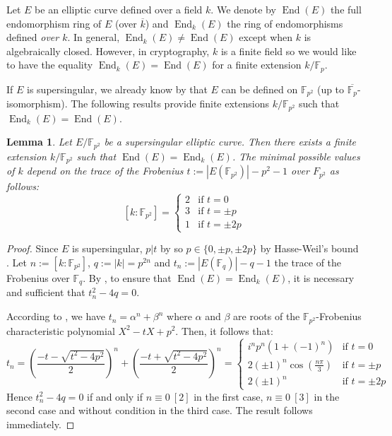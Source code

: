\documentclass[a4paper,10pt]{report}
\theoremstyle{definition}
\theoremstyle{plain}
\newtheorem{lemma}[definition]{Lemma}
\theoremstyle{definition}
\newcommand{\F}{\mathbb{F}}
\renewcommand{\(}{\left(}
\renewcommand{\)}{\right)}
\DeclareMathOperator{\End}{End}
\begin{document}
Let $E$ be an elliptic curve defined over a field $k$.  We denote by $\End(E)$ the full endomorphism ring of $E$ (over $\overline{k}$) and $\End_k(E)$ the ring of endomorphisms defined \emph{over $k$}.  In general,  $\End_k(E)\neq\End(E)$ except when $k$ is algebraically closed.  However,  in cryptography,  $k$ is a finite field so we would like to have the equality $\End_k(E)=\End(E)$ for a finite extension $k/\F_p$.

If $E$ is supersingular,  we already know by \cite[theorem V.3.1]{Silverman1} that $E$ can be defined on $\F_{p^2}$ (up to $\overline{\F_p}$-isomorphism).  The following results provide finite extensions $k/\F_{p^2}$ such that $\End_k(E)=\End(E)$.

\begin{lemma}
Let $E/\F_{p^2}$ be a supersingular elliptic curve.  Then there exists a finite extension $k/\F_{p^2}$ such that $\End(E)=\End_k(E)$.  The minimal possible values of $k$ depend on the trace of the Frobenius $t:=|E(\F_{p^2})|-p^2-1$ over $F_{p^2}$ as follows:
\[[k:\F_{p^2}]=\left\{
\begin{array}{cl}
2 & \mbox{if } t=0\\
3 & \mbox{if } t=\pm p\\
1 & \mbox{if } t=\pm 2p 
\end{array}
\right.\]
\end{lemma}

\begin{proof}
Since $E$ is supersingular,  $p|t$ by \cite[theorem V.4.1.a]{Silverman1} so $p\in\{0,\pm p, \pm 2p\}$ by Hasse-Weil's bound \cite[theorem V.1.1]{Silverman1}.  Let $n:=[k:\F_{p^2}]$, $q:=|k|=p^{2n}$ and $t_n:=|E(\F_{q})|-q-1$ the trace of the Frobenius over $\F_q$.  By \cite[theorem 4.1]{Waterhouse1969},  to ensure that $\End(E)=\End_k(E)$,  it is necessary and sufficient that $t_n^2-4q=0$. 

According to \cite[theorem V.2.3.1.a]{Silverman1},  we have $t_n=\alpha^n+\beta^n$ where $\alpha$ and $\beta$ are roots of the $\F_{p^2}$-Frobenius characteristic polynomial $X^2-tX+p^2$.  Then,  it follows that:
\[t_n=\(\frac{-t-\sqrt{t^2-4p^2}}{2}\)^n+\(\frac{-t+\sqrt{t^2-4p^2}}{2}\)^n=\left\{
\begin{array}{cl}
i^np^n(1+(-1)^n) & \mbox{if } t=0\\
2(\pm 1)^n\cos\(\frac{n\pi}{3}\)& \mbox{if } t=\pm p\\
2(\pm 1)^n & \mbox{if } t=\pm 2p 
\end{array}
\right.\]
Hence $t_n^2-4q=0$ if and only if $n\equiv 0 \ [2]$ in the first case,  $n\equiv 0 \ [3]$ in the second case and without condition in the third case.  The result follows immediately.
\end{proof}
\end{document}
